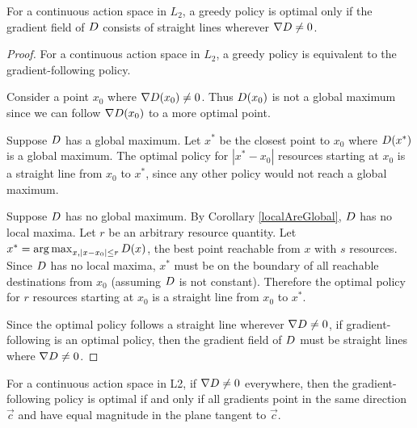\begin{atheorem}
For a continuous action space in $L_2$, a greedy policy is optimal only if the gradient field of $D$ consists of straight lines wherever $\nabla D \ne 0$.
\end{atheorem}
\begin{proof}
For a continuous action space in $L_2$, a greedy policy is equivalent to the gradient-following policy.

Consider a point $x_0$ where $\nabla D(x_0) \ne 0$. Thus $D(x_0)$ is not a global maximum since we can follow $\nabla D(x_0)$ to a more optimal point. 

Suppose $D$ has a global maximum.  Let $x^*$ be the closest point to $x_0$ where $D(x^*)$ is a global maximum. The optimal policy for $|x^* - x_0|$ resources starting at $x_0$ is a straight line from $x_0$ to $x^*$, since any other policy would not reach a global maximum. %

Suppose $D$ has no global maximum. By Corollary \ref{localAreGlobal}, $D$ has no local maxima. Let $r$ be an arbitrary resource quantity. Let $x^* = \operatorname*{arg\,max}_{x, |x-x_0| \le r} D(x)$, the best point reachable from $x$ with $s$ resources. Since $D$ has no local maxima, $x^*$ must be on the boundary of all reachable destinations from $x_0$ (assuming $D$ is not constant). Therefore the optimal policy for $r$ resources starting at $x_0$ is a straight line from $x_0$ to $x^*$.

Since the optimal policy follows a straight line wherever $\nabla D \ne 0$, if gradient-following is an optimal policy, then the gradient field of $D$ must be straight lines where $\nabla D \ne 0$.
\end{proof}

\begin{acorollary}
For a continuous action space in L2, if $\nabla D \ne 0$ everywhere, then the gradient-following policy is optimal if and only if all gradients point in the same direction $\vec c$ and have equal magnitude in the plane tangent to $\vec c$.
\end{acorollary}

